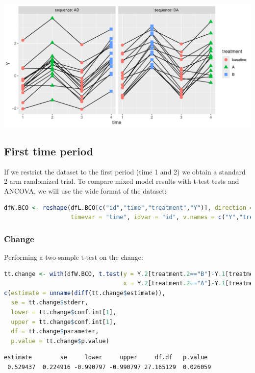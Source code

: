 \documentclass[12pt]{article}
\begin{document}
\begin{center}
\includegraphics[trim={0 0 0 0},width=1\textwidth]{./figures/spa-BCO.pdf}
\end{center}
\subsection{First time period}
\label{sec:org734089b}

If we restrict the dataset to the first period (time 1 and 2) we
obtain a standard 2 arm randomized trial. To compare mixed model
results with t-test tests and ANCOVA, we will use the wide format of
the dataset:
\begin{lstlisting}[language=r,numbers=none]
dfW.BCO <- reshape(dfL.BCO[c("id","time","treatment","Y")], direction = "wide",
                   timevar = "time", idvar = "id", v.names = c("Y","treatment"))
\end{lstlisting}
\subsubsection{Change}
\label{sec:org5b68991}

Performing a two-sample t-test on the change:
\begin{lstlisting}[language=r,numbers=none]
tt.change <- with(dfW.BCO, t.test(y = Y.2[treatment.2=="B"]-Y.1[treatment.2=="B"],
                                  x = Y.2[treatment.2=="A"]-Y.1[treatment.2=="A"]))
c(estimate = unname(diff(tt.change$estimate)),
  se = tt.change$stderr,
  lower = tt.change$conf.int[1],
  upper = tt.change$conf.int[1],
  df = tt.change$parameter,
  p.value = tt.change$p.value)
\end{lstlisting}

\label{}
\begin{verbatim}
estimate        se     lower     upper     df.df   p.value 
 0.529437  0.224916 -0.990797 -0.990797 27.165129  0.026059
\end{verbatim}
\end{document}
